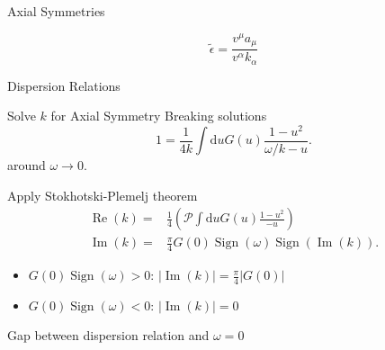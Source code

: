 

\begin{frame}{Axial Symmetries}

\begin{equation*}
   \tilde \epsilon = \frac{ v^\mu a_\mu }{ v^\alpha k_\alpha }
\end{equation*}


\end{frame}


\begin{frame}{Dispersion Relations}

Solve $k$ for Axial Symmetry Breaking solutions
\begin{equation*}
   1 = \frac{1}{4k} \int \mathrm du G(u) \frac{ 1 - u^2 }{ \omega/k - u }.
\end{equation*}
around  $\omega\to 0$.

\pause

Apply Stokhotski-Plemelj theorem
\begin{align*}
\operatorname{Re}(k) =& \frac{1}{4}\left(  \mathcal{P} \int \mathrm d u G(u) \frac{ 1 - u^2 }{ - u }  \right)\label{eqn-re-k-arbitrary-spectrum} \\
\operatorname{Im}(k) =&  \frac{\pi}{4}G(0) \operatorname{Sign}\left( \omega \right) \operatorname{Sign}\left(  \operatorname{Im}(k)  \right).
\end{align*}

\pause

\begin{itemize}
   \item $G(0) \operatorname{Sign}(\omega) > 0$: $\lvert \operatorname{Im}(k) \rvert  =  \frac{\pi}{4}\lvert G(0)\rvert$
   \item $G(0) \operatorname{Sign}(\omega) < 0$: $\lvert \operatorname{Im}(k) \rvert  = 0$
\end{itemize}

\pause
\begin{tcolorbox}
   Gap between dispersion relation and $\omega=0$
\end{tcolorbox}


%
%




\end{frame}

